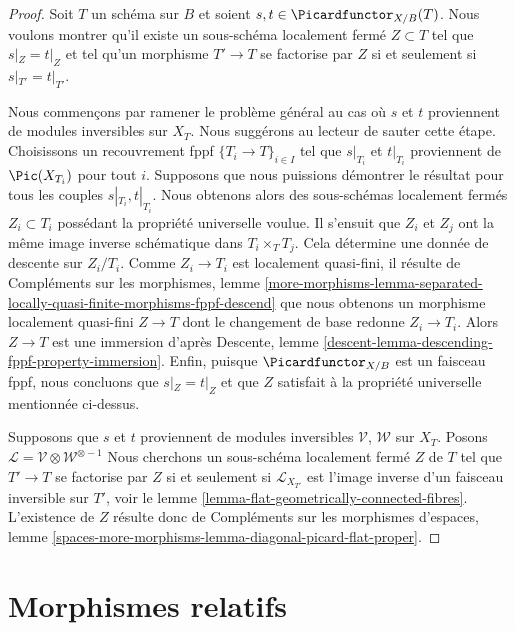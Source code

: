 \begin{proof}
Soit $T$ un schéma sur $B$ et soient $s, t \in \Picardfunctor_{X/B}(T)$.
Nous voulons montrer qu'il existe un sous-schéma localement fermé
$Z \subset T$ tel que $s|_Z = t|_Z$ et tel qu'un morphisme $T' \to T$ se
factorise par $Z$ si et seulement si $s|_{T'} = t|_{T'}$.

\medskip\noindent
Nous commençons par ramener le problème général au cas où $s$ et $t$
proviennent de modules inversibles sur $X_T$. Nous suggérons au lecteur de
sauter cette étape. Choisissons un recouvrement fppf
$\{T_i \to T\}_{i \in I}$ tel que $s|_{T_i}$ et $t|_{T_i}$ proviennent de
$\Pic(X_{T_i})$ pour tout $i$.
Supposons que nous puissions démontrer le résultat pour tous les couples
$s|_{T_i}, t|_{T_i}$. Nous obtenons alors des sous-schémas localement fermés
$Z_i \subset T_i$ possédant la propriété universelle voulue.
Il s'ensuit que $Z_i$ et $Z_j$ ont la même image inverse schématique dans
$T_i \times_T T_j$.
Cela détermine une donnée de descente sur $Z_i/T_i$.
Comme $Z_i \to T_i$ est localement quasi-fini, il résulte de
Compléments sur les morphismes, lemme
\ref{more-morphisms-lemma-separated-locally-quasi-finite-morphisms-fppf-descend}
que nous obtenons un morphisme localement quasi-fini $Z \to T$ dont le
changement de base redonne $Z_i \to T_i$. Alors $Z \to T$ est une immersion
d'après Descente, lemme
\ref{descent-lemma-descending-fppf-property-immersion}.
Enfin, puisque $\Picardfunctor_{X/B}$ est un faisceau fppf, nous concluons que
$s|_Z = t|_Z$ et que $Z$ satisfait à la propriété universelle mentionnée
ci-dessus.

\medskip\noindent
Supposons que $s$ et $t$ proviennent de modules inversibles
$\mathcal{V}$, $\mathcal{W}$ sur $X_T$.
Posons $\mathcal{L} = \mathcal{V} \otimes \mathcal{W}^{\otimes -1}$
Nous cherchons un sous-schéma localement fermé $Z$ de $T$ tel que
$T' \to T$ se factorise par $Z$ si et seulement si
$\mathcal{L}_{X_{T'}}$ est l'image inverse d'un faisceau inversible sur $T'$,
voir le lemme \ref{lemma-flat-geometrically-connected-fibres}.
L'existence de $Z$ résulte donc de
Compléments sur les morphismes d'espaces, lemme
\ref{spaces-more-morphisms-lemma-diagonal-picard-flat-proper}.
\end{proof}

\section{Morphismes relatifs}
\label{section-relative-morphisms}

